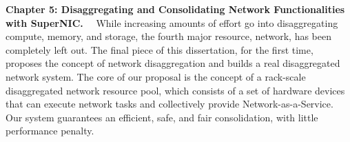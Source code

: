 \textbf{Chapter 5: Disaggregating and Consolidating Network Functionalities with SuperNIC.}~~
While increasing amounts of effort go into disaggregating compute, memory, and storage, the fourth major resource, network, has been completely left out.
The final piece of this dissertation, for the first time, proposes the concept of network disaggregation and builds a real disaggregated network system.
The core of our proposal is the concept of a rack-scale disaggregated network resource pool, which consists of a set of hardware devices that can execute network tasks and collectively provide Network-as-a-Service.
Our system guarantees an efficient, safe, and fair consolidation, with little performance penalty.